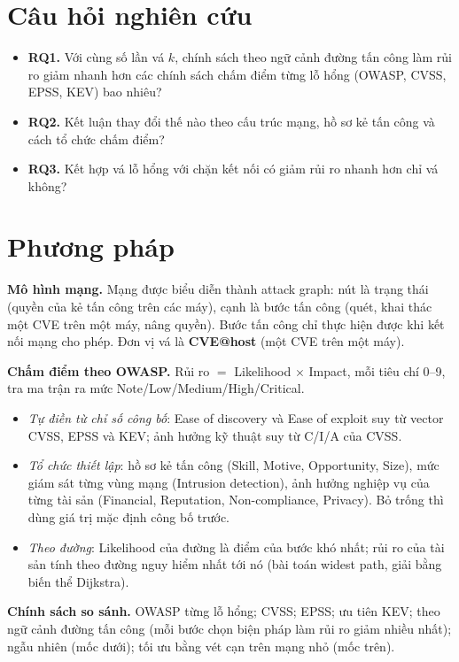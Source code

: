 \documentclass[11pt,a4paper]{article}
\begin{document}
\section{Câu hỏi nghiên cứu}

\begin{itemize}
  \item \textbf{RQ1.} Với cùng số lần vá $k$, chính sách theo ngữ cảnh đường tấn công làm rủi ro giảm nhanh hơn các chính sách chấm điểm từng lỗ hổng (OWASP, CVSS, EPSS, KEV) bao nhiêu?
  \item \textbf{RQ2.} Kết luận thay đổi thế nào theo cấu trúc mạng, hồ sơ kẻ tấn công và cách tổ chức chấm điểm?
  \item \textbf{RQ3.} Kết hợp vá lỗ hổng với chặn kết nối có giảm rủi ro nhanh hơn chỉ vá không?
\end{itemize}

\section{Phương pháp}

\textbf{Mô hình mạng.} Mạng được biểu diễn thành attack graph: nút là trạng thái (quyền của kẻ tấn công trên các máy), cạnh là bước tấn công (quét, khai thác một CVE trên một máy, nâng quyền). Bước tấn công chỉ thực hiện được khi kết nối mạng cho phép. Đơn vị vá là \textbf{CVE@host} (một CVE trên một máy).

\textbf{Chấm điểm theo OWASP.} Rủi ro $=$ Likelihood $\times$ Impact, mỗi tiêu chí 0--9, tra ma trận ra mức Note/Low/Medium/High/Critical.
\begin{itemize}
  \item \emph{Tự điền từ chỉ số công bố}: Ease of discovery và Ease of exploit suy từ vector CVSS, EPSS và KEV; ảnh hưởng kỹ thuật suy từ C/I/A của CVSS.
  \item \emph{Tổ chức thiết lập}: hồ sơ kẻ tấn công (Skill, Motive, Opportunity, Size), mức giám sát từng vùng mạng (Intrusion detection), ảnh hưởng nghiệp vụ của từng tài sản (Financial, Reputation, Non-compliance, Privacy). Bỏ trống thì dùng giá trị mặc định công bố trước.
  \item \emph{Theo đường}: Likelihood của đường là điểm của bước khó nhất; rủi ro của tài sản tính theo đường nguy hiểm nhất tới nó (bài toán widest path, giải bằng biến thể Dijkstra).
\end{itemize}

\textbf{Chính sách so sánh.} OWASP từng lỗ hổng; CVSS; EPSS; ưu tiên KEV; theo ngữ cảnh đường tấn công (mỗi bước chọn biện pháp làm rủi ro giảm nhiều nhất); ngẫu nhiên (mốc dưới); tối ưu bằng vét cạn trên mạng nhỏ (mốc trên).
\end{document}
